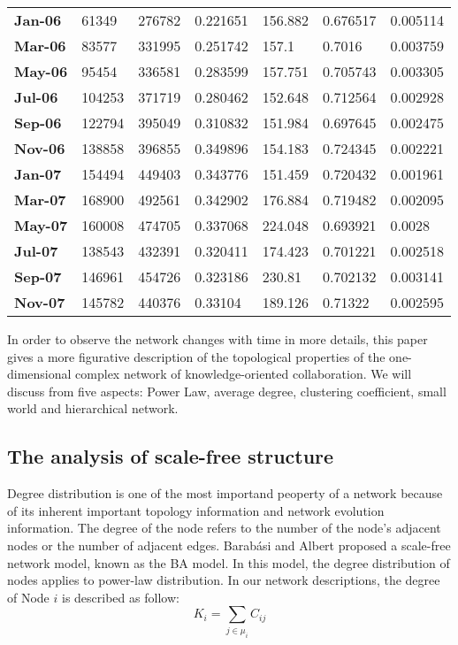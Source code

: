\documentclass{elsarticle}
\begin{document}
\begin{table}[htbp]
\begin{tabular}{lllllll}
    {\bf Jan-06} & 61349 & 276782 & 0.221651 & 156.882 & 0.676517 & 0.005114 \\
    {\bf Mar-06} & 83577 & 331995 & 0.251742 & 157.1 & 0.7016 & 0.003759 \\
    {\bf May-06} & 95454 & 336581 & 0.283599 & 157.751 & 0.705743 & 0.003305 \\
    {\bf Jul-06} & 104253 & 371719 & 0.280462 & 152.648 & 0.712564 & 0.002928 \\
    {\bf Sep-06} & 122794 & 395049 & 0.310832 & 151.984 & 0.697645 & 0.002475 \\
    {\bf Nov-06} & 138858 & 396855 & 0.349896 & 154.183 & 0.724345 & 0.002221 \\
    {\bf Jan-07} & 154494 & 449403 & 0.343776 & 151.459 & 0.720432 & 0.001961 \\
    {\bf Mar-07} & 168900 & 492561 & 0.342902 & 176.884 & 0.719482 & 0.002095 \\
    {\bf May-07} & 160008 & 474705 & 0.337068 & 224.048 & 0.693921 & 0.0028 \\
    {\bf Jul-07} & 138543 & 432391 & 0.320411 & 174.423 & 0.701221 & 0.002518 \\
    {\bf Sep-07} & 146961 & 454726 & 0.323186 & 230.81 & 0.702132 & 0.003141 \\
    {\bf Nov-07} & 145782 & 440376 & 0.33104 & 189.126 & 0.71322 & 0.002595 \\\bottomrule
       \end{tabular}
  \label{tab:addlabel}
\end{table}
In order to observe the network changes with time in more details,
this paper gives a more figurative description of the topological
properties of the one-dimensional complex network of
knowledge-oriented collaboration. We will discuss from five aspects: Power Law, average degree, clustering coefficient, small world and hierarchical network.

\subsection{The analysis of scale-free structure}
\label{sec:analysis-scale-free}

Degree distribution is one of the most
importand peoperty of a network because of its inherent important
topology information and network evolution information.   The degree of
the node refers to the number of the node's adjacent nodes or the
number of adjacent edges.  Barabási and
Albert proposed a scale-free network model, known as the BA
model\cite{barabasi1999esr}. In this model,  the degree distribution of nodes   applies to power-law distribution.  In our network descriptions, the degree of Node $i$ is described as follow: 
\begin{equation}
  K_i=\sum_{j\in\mu_i}C_{ij}
\end{equation}
\end{document}
